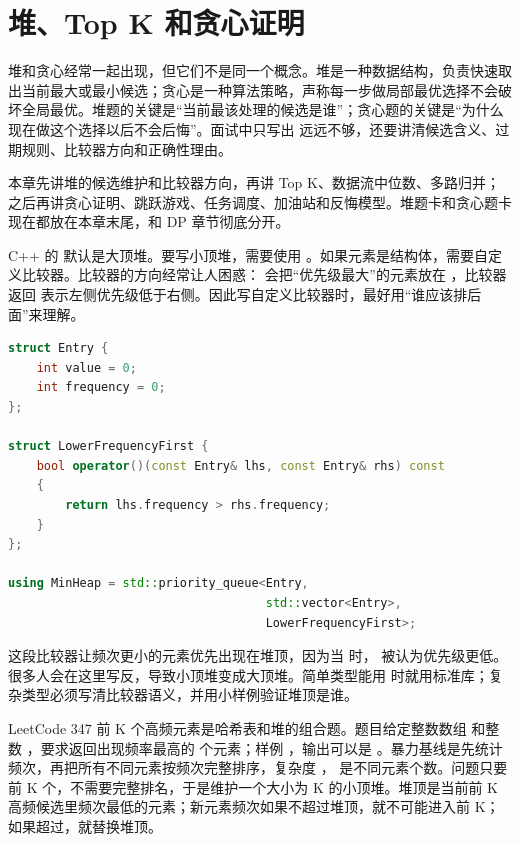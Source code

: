 \chapter{堆、Top K 和贪心证明}

堆和贪心经常一起出现，但它们不是同一个概念。堆是一种数据结构，负责快速取出当前最大或最小候选；贪心是一种算法策略，声称每一步做局部最优选择不会破坏全局最优。堆题的关键是“当前最该处理的候选是谁”；贪心题的关键是“为什么现在做这个选择以后不会后悔”。面试中只写出  远远不够，还要讲清候选含义、过期规则、比较器方向和正确性理由。

本章先讲堆的候选维护和比较器方向，再讲 Top K、数据流中位数、多路归并；之后再讲贪心证明、跳跃游戏、任务调度、加油站和反悔模型。堆题卡和贪心题卡现在都放在本章末尾，和 DP 章节彻底分开。

C++ 的  默认是大顶堆。要写小顶堆，需要使用 。如果元素是结构体，需要自定义比较器。比较器的方向经常让人困惑： 会把“优先级最大”的元素放在 ，比较器返回  表示左侧优先级低于右侧。因此写自定义比较器时，最好用“谁应该排后面”来理解。

\begin{lstlisting}[language=C++,caption={priority\_queue 的比较器方向}]
struct Entry {
    int value = 0;
    int frequency = 0;
};

struct LowerFrequencyFirst {
    bool operator()(const Entry& lhs, const Entry& rhs) const
    {
        return lhs.frequency > rhs.frequency;
    }
};

using MinHeap = std::priority_queue<Entry,
                                    std::vector<Entry>,
                                    LowerFrequencyFirst>;
\end{lstlisting}

这段比较器让频次更小的元素优先出现在堆顶，因为当  时， 被认为优先级更低。很多人会在这里写反，导致小顶堆变成大顶堆。简单类型能用  时就用标准库；复杂类型必须写清比较器语义，并用小样例验证堆顶是谁。

LeetCode 347 前 K 个高频元素是哈希表和堆的组合题。题目给定整数数组  和整数 ，要求返回出现频率最高的  个元素；样例 ，输出可以是 \code{[1,2]}。暴力基线是先统计频次，再把所有不同元素按频次完整排序，复杂度 ， 是不同元素个数。问题只要前 K 个，不需要完整排名，于是维护一个大小为 K 的小顶堆。堆顶是当前前 K 高频候选里频次最低的元素；新元素频次如果不超过堆顶，就不可能进入前 K；如果超过，就替换堆顶。

